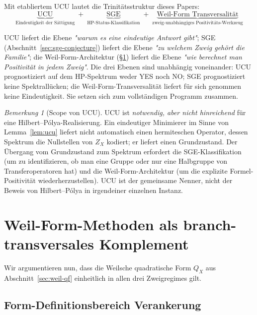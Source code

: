 \documentclass[11pt]{article}
\theoremstyle{definition}
\theoremstyle{remark}
\newtheorem{remark}[theorem]{Bemerkung}
\begin{document}
Mit etabliertem UCU lautet die Trinitätsstruktur dieses Papers:
\[
  \underbrace{\text{UCU}}_{\text{Eindeutigkeit der Sättigung}}
  \;+\;
  \underbrace{\text{SGE}}_{\text{HP-Status-Klassifikation}}
  \;+\;
  \underbrace{\text{Weil-Form Transversalität}}_{\text{zweig-unabhängiges Positivitäts-Werkzeug}}
\]

UCU liefert die Ebene \emph{"warum es eine eindeutige Antwort gibt"}; SGE
(Abschnitt~\ref{sec:sge-conjecture}) liefert die Ebene \emph{"zu welchem Zweig gehört
die Familie"}; die Weil-Form-Architektur (\S\ref{sec:weil-transversal}) liefert die Ebene
\emph{"wie berechnet man Positivität in jedem Zweig"}. Die drei Ebenen sind
unabhängig voneinander: UCU prognostiziert auf dem HP-Spektrum weder YES noch NO;
SGE prognostiziert keine Spektrallücken; die Weil-Form-Transversalität liefert
für sich genommen keine Eindeutigkeit. Sie setzen sich zum vollständigen Programm zusammen.

\begin{remark}[Scope von UCU]\label{rem:ucu-scope}
UCU ist \emph{notwendig, aber nicht hinreichend} für eine Hilbert--P\'olya-Realisierung.
Ein eindeutiger Minimierer im Sinne von Lemma~\ref{lem:ucu} liefert nicht automatisch
einen hermiteschen Operator, dessen Spektrum die Nullstellen von $Z_X$ kodiert;
er liefert einen Grundzustand. Der Übergang vom Grundzustand zum Spektrum
erfordert die SGE-Klassifikation (um zu identifizieren, ob man eine Gruppe oder
nur eine Halbgruppe von Transferoperatoren hat) und die Weil-Form-Architektur
(um die explizite Formel-Positivität wiederherzustellen). UCU ist
der gemeinsame Nenner, nicht der Beweis von Hilbert--P\'olya in irgendeiner
einzelnen Instanz.
\end{remark}

\section{Weil-Form-Methoden als branch-transversales Komplement}
\label{sec:weil-transversal}

Wir argumentieren nun, dass die Weilsche quadratische Form $Q_X$ aus
Abschnitt~\ref{sec:weil-qf} einheitlich in allen drei Zweigregimes gilt.

\subsection{Form-Definitionsbereich Verankerung}
\label{sec:weil-form-domain}
\end{document}
